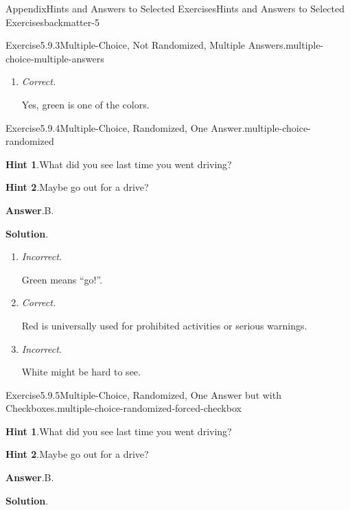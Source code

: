 \documentclass[oneside,10pt,]{book}
\newcommand{\blocktitlefont}{\relax}
\newcommand{\lititle}[1]{{\slshape#1}}
\numberwithin{equation}{section}
\begin{document}
\begin{solutions-chapter}{Appendix}{Hints and Answers to Selected Exercises}{}{Hints and Answers to Selected Exercises}{}{}{backmatter-5}
\begin{divisionsolution}{Exercise}{5.9.3}{Multiple-Choice, Not Randomized, Multiple Answers.}{multiple-choice-multiple-answers}
\begin{enumerate}[label={\Alph*.}]
\item{}\lititle{Correct.}\par%
Yes, green is one of the colors.%
\end{enumerate}
%
\end{divisionsolution}%
\begin{divisionsolution}{Exercise}{5.9.4}{Multiple-Choice, Randomized, One Answer.}{multiple-choice-randomized}%
\par\smallskip%
\noindent\textbf{\blocktitlefont Hint 1}.\hypertarget{multiple-choice-randomized-4-back}{}\quad{}What did you see last time you went driving?%
\par\smallskip%
\noindent\textbf{\blocktitlefont Hint 2}.\hypertarget{multiple-choice-randomized-5-back}{}\quad{}Maybe go out for a drive?%
\par\smallskip%
\noindent\textbf{\blocktitlefont Answer}.\hypertarget{multiple-choice-randomized-6-back}{}\quad{}B.%
\par\smallskip%
\noindent\textbf{\blocktitlefont Solution}.\hypertarget{multiple-choice-randomized-7-back}{}\quad{}%
\begin{enumerate}[label={\Alph*.}]
\item{}\lititle{Incorrect.}\par%
Green means ``go!''.%
\item{}\lititle{Correct.}\par%
Red is universally used for prohibited activities or serious warnings.%
\item{}\lititle{Incorrect.}\par%
White might be hard to see.%
\end{enumerate}
%
\end{divisionsolution}%
\begin{divisionsolution}{Exercise}{5.9.5}{Multiple-Choice, Randomized, One Answer but with Checkboxes.}{multiple-choice-randomized-forced-checkbox}%
\par\smallskip%
\noindent\textbf{\blocktitlefont Hint 1}.\hypertarget{multiple-choice-randomized-forced-checkbox-4-back}{}\quad{}What did you see last time you went driving?%
\par\smallskip%
\noindent\textbf{\blocktitlefont Hint 2}.\hypertarget{multiple-choice-randomized-forced-checkbox-5-back}{}\quad{}Maybe go out for a drive?%
\par\smallskip%
\noindent\textbf{\blocktitlefont Answer}.\hypertarget{multiple-choice-randomized-forced-checkbox-6-back}{}\quad{}B.%
\par\smallskip%
\noindent\textbf{\blocktitlefont Solution}.\hypertarget{multiple-choice-randomized-forced-checkbox-7-back}{}\quad{}%

\end{divisionsolution}
\end{solutions-chapter}
\end{document}
